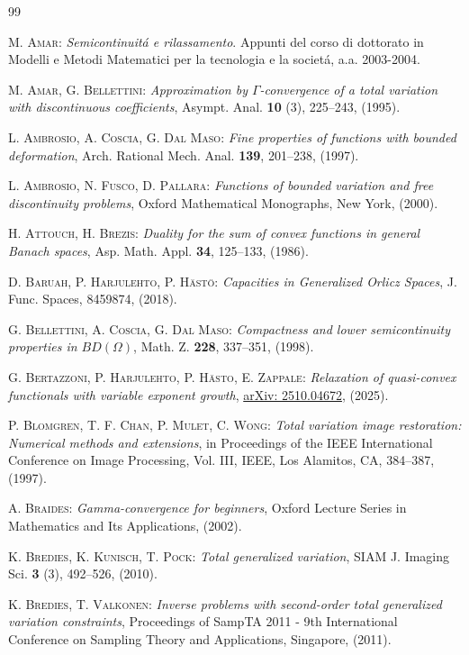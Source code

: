 \documentclass[a4paper,11pt,oneside,notitlepage]{article}
\numberwithin{equation}{section}
\begin{document}
\begin{thebibliography}{99}

 \textsc{M. Amar:} \emph{Semicontinuit\'a e rilassamento}. Appunti del corso di dottorato in Modelli e Metodi Matematici per la tecnologia e la societ\'a, a.a. 2003-2004.

 \textsc{M. Amar, G. Bellettini:} \emph{Approximation by $\Gamma$-convergence of a total variation with discontinuous coefficients}, Asympt. Anal. {\bf 10} (3), 225--243, (1995).

 \textsc{L. Ambrosio, A. Coscia, G. Dal Maso:} \emph{Fine properties of functions with bounded deformation}, Arch. Rational Mech. Anal. {\bf 139}, 201--238, (1997).

 \textsc{L. Ambrosio, N. Fusco, D. Pallara:} \emph{Functions of bounded variation and free discontinuity problems}, Oxford Mathematical Monographs, New York, (2000).
    
 \textsc{H. Attouch, H. Brezis:} \emph{Duality for the sum of convex functions in general Banach spaces}, Asp. Math. Appl. {\bf 34}, 125--133, (1986).

 \textsc{D. Baruah, P. Harjulehto, P. H\"ast\"o:} \emph{Capacities in Generalized Orlicz Spaces}, J. Func. Spaces, 8459874, (2018).

 \textsc{G. Bellettini, A. Coscia, G. Dal Maso:} \emph{Compactness and lower semicontinuity properties in $BD(\Omega)$}, Math. Z. {\bf 228}, 337--351, (1998).

 \textsc{G. Bertazzoni, P. Harjulehto, P. H\"asto, E. Zappale:} \emph{Relaxation of quasi-convex functionals with variable exponent growth}, \href{https://arxiv.org/abs/2510.04672}{arXiv: 2510.04672}, (2025).

 \textsc{P. Blomgren, T. F. Chan, P. Mulet, C. Wong:} \emph{Total variation image restoration: Numerical methods and extensions}, in Proceedings of the IEEE International Conference on Image Processing, Vol. III, IEEE, Los Alamitos, CA, 384--387, (1997).

 \textsc{A. Braides:} \emph{Gamma-convergence for beginners}, Oxford Lecture Series in Mathematics and Its Applications, (2002). 

 \textsc{K. Bredies, K. Kunisch, T. Pock:} \emph{Total generalized variation}, SIAM J. Imaging Sci. {\bf 3} (3), 492--526, (2010).

 \textsc{K. Bredies, T. Valkonen:} \emph{Inverse problems with second-order total generalized variation constraints}, Proceedings of SampTA 2011 - 9th International Conference on Sampling Theory and Applications, Singapore, (2011).


\end{thebibliography}
\end{document}
